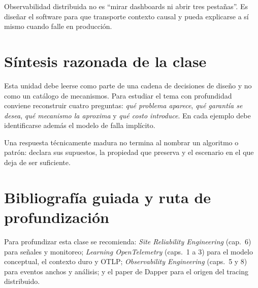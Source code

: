 \documentclass[variant=apuntes,cover=institutional,mode=screen]{ua-engineering-v6-article}
\begin{document}
\begin{uakeybox}
Observabilidad distribuida no es ``mirar dashboards ni abrir tres pestañas''. Es diseñar el software para que transporte contexto causal y pueda explicarse a sí mismo cuando falle en producción.
\end{uakeybox}

\section{Síntesis razonada de la clase}
Esta unidad debe leerse como parte de una cadena de decisiones de diseño y no como un catálogo de mecanismos. Para estudiar el tema con profundidad conviene reconstruir cuatro preguntas: \emph{qué problema aparece}, \emph{qué garantía se desea}, \emph{qué mecanismo la aproxima} y \emph{qué costo introduce}. En cada ejemplo debe identificarse además el modelo de falla implícito.

\begin{uakeybox}
Una respuesta técnicamente madura no termina al nombrar un algoritmo o patrón: declara sus supuestos, la propiedad que preserva y el escenario en el que deja de ser suficiente.
\end{uakeybox}

\section{Bibliografía guiada y ruta de profundización}
Para profundizar esta clase se recomienda: \emph{Site Reliability Engineering} (cap.~6) para señales y monitoreo; \emph{Learning OpenTelemetry} (caps.~1 a 3) para el modelo conceptual, el contexto duro y OTLP; \emph{Observability Engineering} (caps.~5 y 8) para eventos anchos y análisis; y el paper de Dapper para el origen del tracing distribuido.
\end{document}
